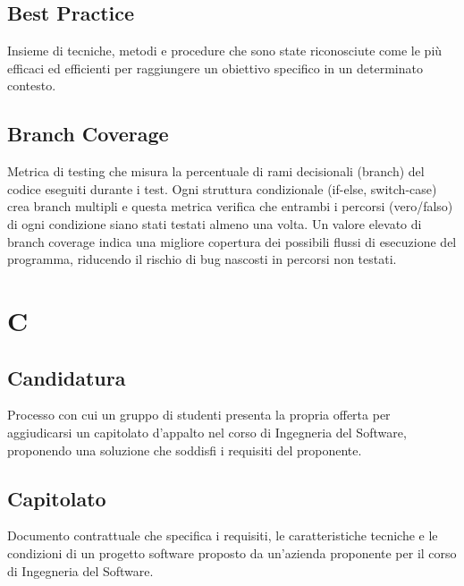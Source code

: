 \documentclass[a4paper,11pt]{article}
\begin{document}
\subsection{Best Practice}
Insieme di tecniche, metodi e procedure che sono state riconosciute come le più efficaci ed efficienti per raggiungere un obiettivo specifico in un determinato contesto.









\subsection{Branch Coverage}
Metrica di testing che misura la percentuale di rami decisionali (branch) del codice eseguiti durante i test. Ogni struttura condizionale (if-else, switch-case) crea branch multipli e questa metrica verifica che entrambi i percorsi (vero/falso) di ogni condizione siano stati testati almeno una volta. Un valore elevato di branch coverage indica una migliore copertura dei possibili flussi di esecuzione del programma, riducendo il rischio di bug nascosti in percorsi non testati.


\newpage





\section{C}

\subsection{Candidatura}
Processo con cui un gruppo di studenti presenta la propria offerta per aggiudicarsi un capitolato d'appalto nel corso di Ingegneria del Software, proponendo una soluzione che soddisfi i requisiti del proponente.









\subsection{Capitolato}
Documento contrattuale che specifica i requisiti, le caratteristiche tecniche e le condizioni di un progetto software proposto da un'azienda proponente per il corso di Ingegneria del Software.
\end{document}
